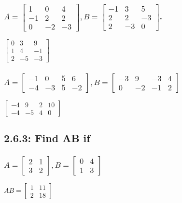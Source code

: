 \documentclass[12pt, a4paper]{report}
\begin{document}
				\subsubsection{$A=\begin{bmatrix}1&0&4\\-1&2&2\\0&-2&-3\end{bmatrix},B=\begin{bmatrix}-1&3&5\\2&2&-3\\2&-3&0\end{bmatrix}$.}
					$\begin{bmatrix}0&3&9\\1&4&-1\\2&-5&-3\end{bmatrix}$
				\subsubsection{$A=\begin{bmatrix}-1&0&5&6\\-4&-3&5&-2\end{bmatrix}, B=\begin{bmatrix}-3&9&-3&4\\0&-2&-1&2\end{bmatrix}$}
					$\begin{bmatrix}-4&9&2&10\\-4&-5&4&0\end{bmatrix}$
			\subsection{2.6.3: Find AB if}
				\subsubsection{$A=\begin{bmatrix}2&1\\3&2\end{bmatrix}, B=\begin{bmatrix}0&4\\1&3\end{bmatrix}$}
					$AB=\begin{bmatrix}1&11\\2&18\end{bmatrix}$
			\setcounter{subsection}{4}
\end{document}
